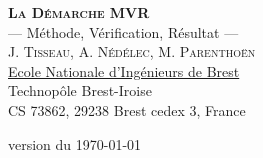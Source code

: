 \documentclass[11pt,a4paper,colorlinks,breaklinks]{article}
\begin{document}

\begin{center}
\textbf{\textsc{\Large La Démarche MVR}}\\[2mm]
--- Méthode, Vérification, Résultat ---\\[5mm]
\textsc{J. Tisseau, A. Nédélec, M. Parenthoën}\\[2mm]
\href{http://www.enib.fr}{Ecole Nationale d'Ingénieurs de Brest}\\
Technopôle Brest-Iroise\\
CS 73862, 29238 Brest cedex 3, France
\end{center}
\null\vfill

\tableofcontents
\null\vfill

\centerline{{\tiny version du \today}}
\newpage
\end{document}

